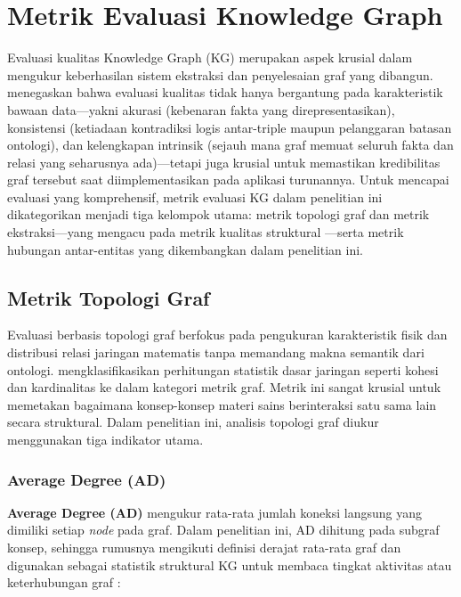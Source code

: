 \documentclass[../../thesis]{subfiles}
\begin{document}
\section{Metrik Evaluasi Knowledge Graph}

Evaluasi kualitas Knowledge Graph (KG) merupakan aspek krusial dalam
mengukur keberhasilan sistem ekstraksi dan penyelesaian graf yang
dibangun. \textcite{xue_knowledge_2022} menegaskan bahwa evaluasi kualitas tidak
hanya bergantung pada karakteristik bawaan data---yakni akurasi
(kebenaran fakta yang direpresentasikan), konsistensi (ketiadaan
kontradiksi logis antar-triple maupun pelanggaran batasan ontologi), dan
kelengkapan intrinsik (sejauh mana graf memuat seluruh fakta dan relasi
yang seharusnya ada)---tetapi juga krusial untuk
memastikan kredibilitas graf tersebut saat diimplementasikan pada
aplikasi turunannya. Untuk mencapai evaluasi yang komprehensif, metrik
evaluasi KG dalam penelitian ini dikategorikan menjadi tiga kelompok
utama: metrik topologi graf dan metrik ekstraksi---yang mengacu pada metrik kualitas 
struktural \parencite{seo_structural_2022}---serta metrik hubungan antar-entitas yang 
dikembangkan dalam penelitian ini.

\subsection{Metrik Topologi Graf}
\label{subsec:metrik-topologi}

Evaluasi berbasis topologi graf berfokus pada pengukuran karakteristik
fisik dan distribusi relasi jaringan matematis tanpa memandang makna
semantik dari ontologi. \textcite{seo_structural_2022} mengklasifikasikan
perhitungan statistik dasar jaringan seperti kohesi dan kardinalitas ke
dalam kategori metrik graf. Metrik ini sangat krusial untuk memetakan
bagaimana konsep-konsep materi sains berinteraksi satu sama lain secara
struktural. Dalam penelitian ini, analisis topologi graf diukur
menggunakan tiga indikator utama.

\subsubsection{Average Degree (AD)}

\textbf{Average Degree (AD)} mengukur rata-rata jumlah koneksi langsung yang
dimiliki setiap \textit{node} pada graf. Dalam penelitian ini, AD dihitung pada
subgraf konsep, sehingga rumusnya mengikuti definisi derajat rata-rata graf
\parencite{newman_networks_2010} dan digunakan sebagai statistik struktural KG
untuk membaca tingkat aktivitas atau keterhubungan graf
\parencite{ruenin_terekg_2024}:
\end{document}
